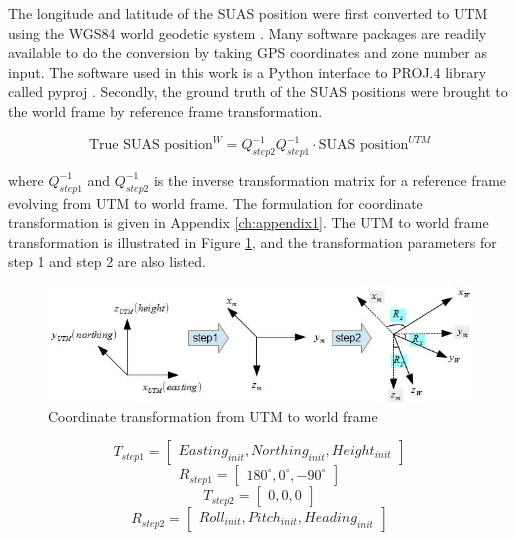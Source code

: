 The longitude and latitude of the SUAS position were first converted
to UTM using the WGS84 world geodetic system \cite{_world_????}. Many
software packages are readily available to do the conversion by taking GPS
coordinates and zone number as input. The software used in this work is
a Python interface to PROJ.4 library \cite{_pyproj_????} called pyproj
\cite{_pyproj_????}. Secondly, the ground truth of the SUAS positions
were brought to the world frame by reference frame transformation.

\begin{equation}\text{True SUAS position}^W = 
Q_{step2}^{-1}Q_{step1}^{-1} \cdot\text{SUAS position}^{UTM}\end{equation}

\noindent where $Q_{step1}^{-1}$ and $Q_{step2}^{-1}$ is the inverse
transformation matrix for a reference frame evolving from UTM to world
frame. The formulation for coordinate transformation is given in
Appendix \ref{ch:appendix1}. The UTM to world frame transformation is
illustrated in Figure \ref{fig:utm_to_world}, and the transformation
parameters for step 1 and step 2 are also listed.

\begin{figure}[h]
  \centering
  \includegraphics[width=12cm,keepaspectratio=true]{./Figures/utm_to_world.jpg}
  \caption{Coordinate transformation from UTM to world frame}
  \label{fig:utm_to_world}
\end{figure}

\begin{equation}T_{step1} = \begin{bmatrix}Easting_{init}, Northing_{init},
  Height_{init}\end{bmatrix}\end{equation}
\begin{equation}R_{step1} = \begin{bmatrix}180^{\circ}, 0^{\circ},
  -90^{\circ}\end{bmatrix}\end{equation}
\begin{equation}T_{step2} = \begin{bmatrix}0, 0, 0\end{bmatrix}\end{equation}
\begin{equation}
R_{step2} = \begin{bmatrix}Roll_{init}, Pitch_{init},
  Heading_{init}\end{bmatrix}
\end{equation}

